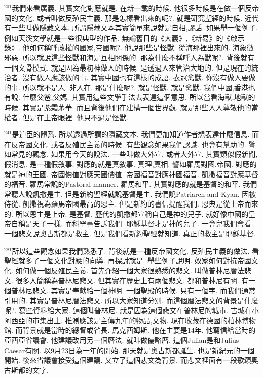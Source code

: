 \documentclass{book}
\begin{document}
$^{201}$我們來看廣義.
其實文化對應就是.
在新一載的時候.
他很多時候是在做一個反帝國的文化.
或者叫做反殖民主義.
那是怎樣看出來的呢?.
就是研究聖經的時候.
近代有一些叫做隱藏文本.
所謂隱藏文本其實簡單來說就是自相,謬話.
如果舉一個例子.
例如天溪文學就是一些很典型的作品.
無論舊日的《大義》,《新易》的《啟示錄》.
他如何稱呼政權的國家,帝國呢?.
他說那些是怪獸.
從海那裡出來的.
海象徵邪惡.
所以就說這些怪獸和海是互相關係的.
那為什麼不稱呼人為獸呢?.
背後就有一個文骨模式.
就是因為最初神做人的時候.
是透過人來管治大地的.
但是現在的統治者.
沒有做人應該做的事.
其實中國也有這樣的成語.
衣冠禽獸.
你沒有做人要做的事.
所以就不是人.
非人在.
那是什麼呢?.
就是怪獸.
就是禽獸.
我們中國,香港也有說.
什麼父爸,父媽.
其實用這些文學手法去表達這個意思.
所以當看海獸,地獸的時候.
其實是紫霜茅華.
而且背後他們在建構一個世界觀.
就是那些人人尊敬他的當權者.
但是在上帝眼裡.
他只不過是怪獸.

$^{241}$是迫臣的體系.
所以透過所謂的隱藏文本.
我們更加知道作者想表達什麼信息.
而在反帝國文化.
或者反殖民主義的時候.
有些觀念如果我們認識.
也會有幫助的.
譬如常見的觀念.
如果用今天的說法.
一些叫做大外宣.
或者大外宣.
其實類似假新聞,假消息.
是一種假敘事.
對應的就是真敘事.
真理,真相.
譬如羅馬對國,帝國.
對應的就是神的王國.
帝國價值對應天國價值.
帝國福音對應神國福音.
凱撒福音對應基督的福音.
羅馬常說的Pastoral manner.
羅馬和平.
其實對應的就是基督的和平.
我們常聽人說凱撒是主.
但是新約聖經就說基督是主.
我們說Patriarch and Kyan.
因被侍從.
凱撒視為羅馬帝國最高的恩主.
但是新約的書信提醒我們.
恩典是從上帝而來的.
所以恩主是上帝.
是基督.
歷代的凱撒都宣稱自己是神的兒子.
就好像中國的皇帝自稱是天子一樣.
而科罕書告訴我們.
耶穌基督才是神的兒子.
一會兒我們會看.
一個悲文說奧古斯都是救主.
但是我們看新約聖經就知道.
真正的救主是耶穌基督.

$^{281}$所以這些觀念如果我們熟悉了.
背後就是一種反帝國文化.
反殖民主義的做法.
看聖經就多了一個文化對應的向導.
再探討就是.
舉些例子說明.
奴家如何對抗帝國文化.
如何做一個反殖民主義.
首先介紹一個大家很熟悉的悲文.
叫做普林尼曆法悲文.
很多人簡稱為普林尼悲文.
但其實在歷史上有兩個悲文.
都和普林尼有關.
有一個普林尼悲文.
其實是奉獻給一個神明.
一個聖殿的時候.
只有一個字.
而我們通常引用的.
其實是普林尼曆法悲文.
所以大家知道分別.
而這個曆法悲文的背景是什麼呢?.
寫些資料給大家.
這個叫普林尼.
就是因為這個悲文在普林尼的城市.
古城在小阿西亞的市集出土.
推測應該是主傳九年的物品,文物.
現在收藏在德國的柏林博物館.
而背景就是當時的總督或省長.
馬克西姆斯.
他在主要是14年.
他寫信給當時的亞西亞省議會.
他建議改用另一個曆法.
就叫做儒略曆.
這個Julian是和Julius Caesar有關.
以9月23日為一年的開始.
那天就是奧古斯都誕生.
也是新紀元的一個開始.
後來省議會接受這個建議.
又立了這個悲文為背景.
而悲文裡面有一段歌頌奧古斯都的文字.
\end{document}
